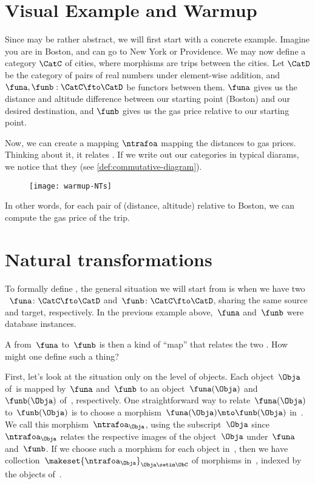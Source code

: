 
\section{Visual Example and Warmup}
Since  may be rather abstract, we will first start with a concrete example. Imagine you are in Boston, and can go to New York or Providence. We may now define a category $\CatC$ of cities, where morphisms are trips between the cities. Let $\CatD$ be the category of pairs of real numbers under element-wise addition, and $\funa, \funb:\CatC\fto\CatD$ be functors between them. $\funa$ gives us the distance and altitude difference between our starting point (Boston) and our desired destination, and $\funb$ gives us the gas price relative to our starting point.

Now, we can create a mapping $\ntrafoa$ mapping the distances to gas prices. Thinking about it, it relates . If we write out our categories in typical diarams, we notice that they  (see \cref{def:commutative-diagram}).

\begin{figure}[h]
    \texttt{[image: warmup-NTs]}
\end{figure}


In other words, for each pair of (distance, altitude) relative to Boston, we can compute the gas price of the trip. 

\section{Natural transformations}

To formally define , the general situation we will start from is when we have two ~$\funa \colon \CatC \fto \CatD$ and~$\funb \colon \CatC \fto \CatD$, sharing the same source and target, respectively.
In the previous example above,~$\funa$ and~$\funb$ were database instances.

A  from~$\funa$ to~$\funb$ is then a kind of ``map'' that relates the two .
How might one define such a thing?

First, let's look at the situation only on the level of objects.
Each object~$\Obja$ of~\CatC is mapped by~$\funa$ and~$\funb$ to an object~$\funa(\Obja)$ and~$\funb(\Obja)$ of~\CatD, respectively.
One straightforward way to relate~$\funa(\Obja)$ to~$\funb(\Obja)$ is to choose a morphism~$\funa(\Obja) \mto \funb(\Obja)$ in~\CatD.
We call this morphism~$\ntrafoa_{\Obja}$, using the subscript~$\Obja$ since~$\ntrafoa_{\Obja}$ relates the respective images of the object~$\Obja$ under~$\funa$ and~$\funb$.
If we choose such a morphism for each object in~\CatC, then we have collection~$\makeset{ \ntrafoa_\Obja }_{\Obja \setin \ObC}$ of morphisms in~\CatD, indexed by the objects of~\CatC.

